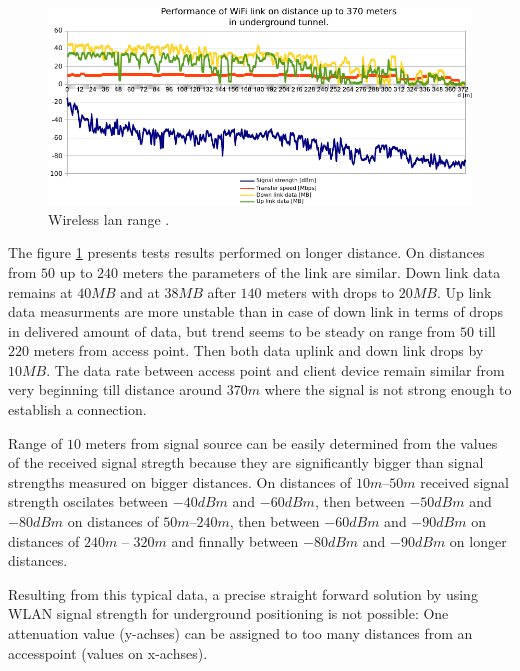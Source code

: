 \documentclass[../main.tex]{subfiles}
\begin{document}
\begin{figure}[!htbp]
\includegraphics[width=\textwidth]{pictures/wifi_link_long.pdf}
\centering
\caption{Wireless lan range \cite{Thesis_CM}. }
\label{fig:wifi_link_long}
\end{figure}

The figure \ref{fig:wifi_link_long} presents tests results performed on longer distance. On distances from $50$ up to $240$ meters the parameters of the link are similar. Down link data remains at $40 MB$ and at $38 MB$ after $140$ meters with drops to $20 MB$. Up link data measurments are more unstable than in case of down link in terms of drops in delivered amount of data, but trend seems to be steady on range from $50$ till $220$ meters from access point. Then both data uplink and down link drops by $10 MB$. The data rate between access point and client device remain similar from very beginning till distance around $370m$ where the signal is not strong enough to establish a connection.

Range of $10$ meters from signal source can be easily determined from the values of the received signal stregth because they are significantly bigger than signal strengths measured on bigger distances. On distances of $10m$--$50m$ received signal strength oscilates between $-40 dBm$ and $-60 dBm$, then between $-50dBm$ and $-80 dBm$ on distances of $50m$--$240m$, then between $-60dBm$ and $-90 dBm$ on distances of $240m$ -- $320m$ and finnally between $-80dBm$ and $-90dBm$ on longer distances.

Resulting from this typical data, a precise straight forward solution by using WLAN signal strength for underground positioning is not possible: One attenuation value (y-achses) can be assigned to too many distances from an accesspoint (values on x-achses).
\end{document}
